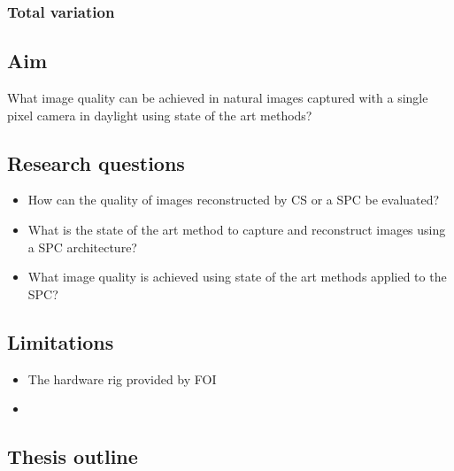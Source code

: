 \subsubsection{Total variation}


\subsection{Aim} 
What image quality can be achieved in natural images captured with a single pixel camera in daylight using state of the art methods?  


\subsection{Research questions} 
\label{sec:RQ}
\begin{itemize}
    \item How can the quality of images reconstructed by CS or a SPC be evaluated?
    \item What is the state of the art method to capture and reconstruct images using a SPC architecture?
    \item What image quality is achieved using state of the art methods applied to the SPC?
\end{itemize}


\subsection{Limitations}
\begin{itemize}
    \item The hardware rig provided by FOI
    \item 
\end{itemize}



\subsection{Thesis outline}
